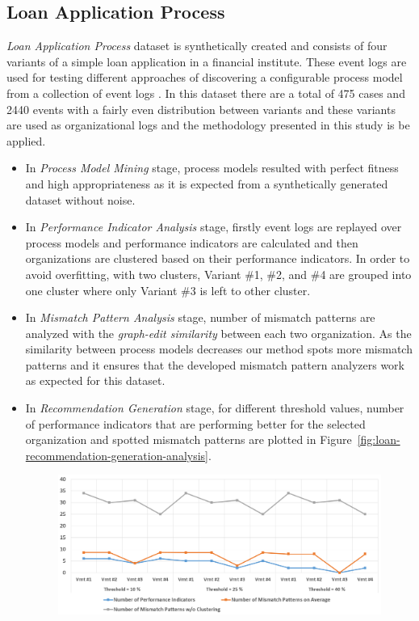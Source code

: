 \subsection{Loan Application Process}
\label{subsec:loan-app-process}
\textit{Loan Application Process} dataset is synthetically created and consists of four variants of a simple loan application in a financial institute. These event logs are used for testing different approaches of discovering a configurable process model from a collection of event logs \cite{buijs2014flexible}. In this dataset there are a total of 475 cases and 2440 events with a fairly even distribution between variants and these variants are used as organizational logs and the methodology presented in this study is be applied.

\begin{itemize}
  \item In \textit{Process Model Mining} stage, process models resulted with perfect fitness and high appropriateness as it is expected from a synthetically generated dataset without noise.
  \item In \textit{Performance Indicator Analysis} stage, firstly event logs are replayed over process models and performance indicators are calculated and then organizations are clustered based on their performance indicators. In order to avoid overfitting,  with two clusters, Variant \#1, \#2, and \#4 are grouped into one cluster where only Variant \#3 is left to other cluster. 
  \item In \textit{Mismatch Pattern Analysis} stage, number of mismatch patterns are analyzed with the \textit{graph-edit similarity} between each two organization. As the similarity between process models decreases our method spots more mismatch patterns and it ensures that the developed mismatch pattern analyzers work as expected for this dataset. 
  \item In \textit{Recommendation Generation} stage, for different threshold values, number of performance indicators that are performing better for the selected organization and spotted mismatch patterns are plotted in Figure~\ref{fig:loan-recommendation-generation-analysis}. 
    \begin{figure}[t!]
    	\centering
    	\includegraphics[width=\textwidth]{5_results_discussions/loan-application-process/recommendation-generation-analysis}

\end{figure}
\end{itemize}

